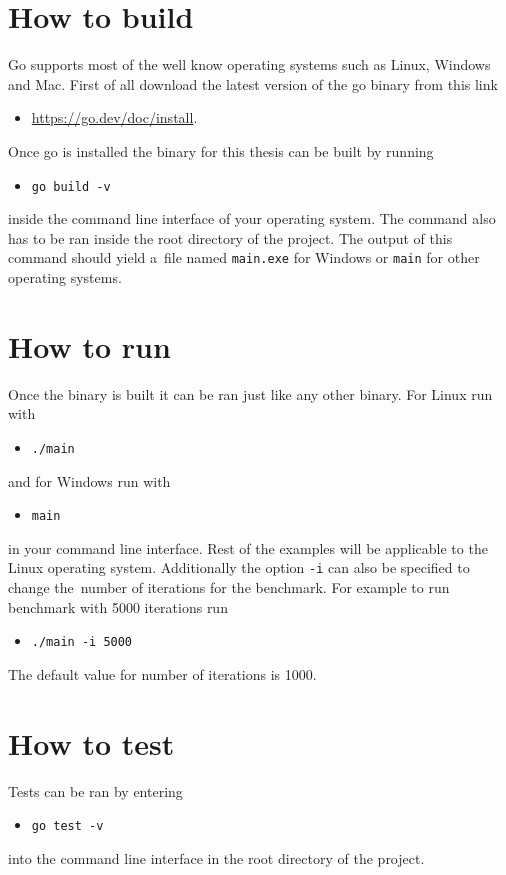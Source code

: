 \section{How to build}
Go supports most of the well know operating systems such as Linux, Windows and Mac. First of all download the latest version of the go binary from this link
\begin{itemize}
  \item \url{https://go.dev/doc/install}.
\end{itemize}
Once go is installed the binary for this thesis can be built by running
\begin{itemize}
  \item \texttt{go build -v}
\end{itemize}
inside the command line interface of your operating system. The command also has to be ran inside the root directory of the project. The output of this command should yield a~file named \texttt{main.exe} for Windows or \texttt{main} for other operating systems.
\section{How to run}
Once the binary is built it can be ran just like any other binary. For Linux run with
\begin{itemize}
  \item \texttt{./main}
\end{itemize}
and for Windows run with
\begin{itemize}
  \item \texttt{main}
\end{itemize}
in your command line interface. Rest of the examples will be applicable to the Linux operating system. Additionally the option \texttt{-i} can also be specified to change the~number of iterations for the benchmark. For example to run benchmark with 5000 iterations run
\begin{itemize}
  \item \texttt{./main -i 5000}
\end{itemize}
The default value for number of iterations is 1000.
\section{How to test}
Tests can be ran by entering
\begin{itemize}
  \item \texttt{go test -v}
\end{itemize}
into the command line interface in the root directory of the project.